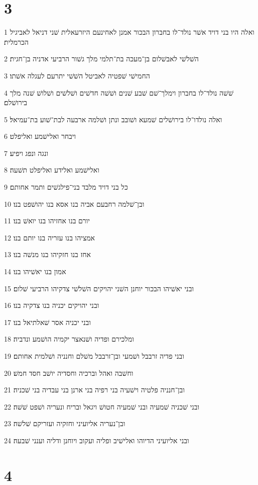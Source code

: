 \chapter{3}

\par 1 ואלה היו בני דויד אשׁר נולד־לו בחברון הבכור אמנן לאחינעם היזרעאלית שׁני דניאל לאביגיל הכרמלית׃
\par 2 השׁלשׁי לאבשׁלום בן־מעכה בת־תלמי מלך גשׁור הרביעי אדניה בן־חגית׃
\par 3 החמישׁי שׁפטיה לאביטל השׁשׁי יתרעם לעגלה אשׁתו׃
\par 4 שׁשׁה נולד־לו בחברון וימלך־שׁם שׁבע שׁנים ושׁשׁה חדשׁים ושׁלשׁים ושׁלושׁ שׁנה מלך בירושׁלם׃
\par 5 ואלה נולדו־לו בירושׁלים שׁמעא ושׁובב ונתן ושׁלמה ארבעה לבת־שׁוע בת־עמיאל׃
\par 6 ויבחר ואלישׁמע ואליפלט׃
\par 7 ונגה ונפג ויפיע׃
\par 8 ואלישׁמע ואלידע ואליפלט תשׁעה׃
\par 9 כל בני דויד מלבד בני־פילגשׁים ותמר אחותם׃
\par 10 ובן־שׁלמה רחבעם אביה בנו אסא בנו יהושׁפט בנו׃
\par 11 יורם בנו אחזיהו בנו יואשׁ בנו׃
\par 12 אמציהו בנו עזריה בנו יותם בנו׃
\par 13 אחז בנו חזקיהו בנו מנשׁה בנו׃
\par 14 אמון בנו יאשׁיהו בנו׃
\par 15 ובני יאשׁיהו הבכור יוחנן השׁני יהויקים השׁלשׁי צדקיהו הרביעי שׁלום׃
\par 16 ובני יהויקים יכניה בנו צדקיה בנו׃
\par 17 ובני יכניה אסר שׁאלתיאל בנו׃
\par 18 ומלכירם ופדיה ושׁנאצר יקמיה הושׁמע ונדביה׃
\par 19 ובני פדיה זרבבל ושׁמעי ובן־זרבבל משׁלם וחנניה ושׁלמית אחותם׃
\par 20 וחשׁבה ואהל וברכיה וחסדיה יושׁב חסד חמשׁ׃
\par 21 ובן־חנניה פלטיה וישׁעיה בני רפיה בני ארנן בני עבדיה בני שׁכניה׃
\par 22 ובני שׁכניה שׁמעיה ובני שׁמעיה חטושׁ ויגאל ובריח ונעריה ושׁפט שׁשׁה׃
\par 23 ובן־נעריה אליועיני וחזקיה ועזריקם שׁלשׁה׃
\par 24 ובני אליועיני הדיוהו ואלישׁיב ופליה ועקוב ויוחנן ודליה וענני שׁבעה׃

\chapter{4}

